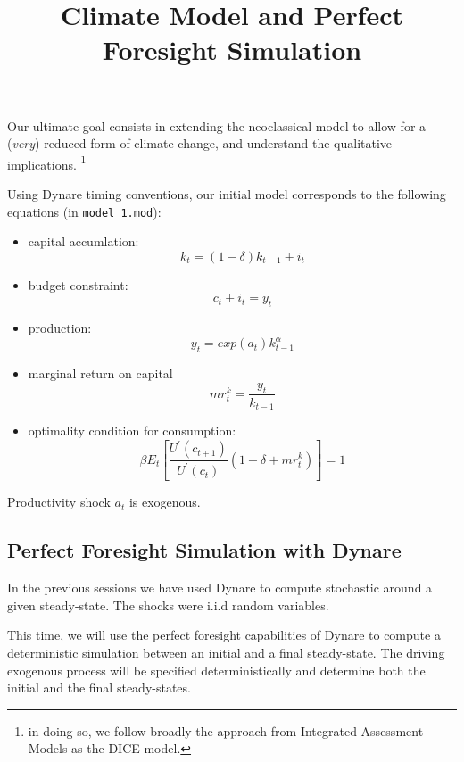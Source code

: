\documentclass[
  letterpaper,
  DIV=11,
  numbers=noendperiod]{scrartcl}
\title{Climate Model and Perfect Foresight Simulation}
\author{}
\date{}
\providecommand{\tightlist}{%
  \setlength{\itemsep}{0pt}\setlength{\parskip}{0pt}}\usepackage{longtable,booktabs,array}
\begin{document}
\maketitle
\ifdefined\Shaded\renewenvironment{Shaded}{\begin{tcolorbox}[breakable, borderline west={3pt}{0pt}{shadecolor}, enhanced, boxrule=0pt, interior hidden, sharp corners, frame hidden]}{\end{tcolorbox}}\fi

Our ultimate goal consists in extending the neoclassical model to allow
for a (\emph{very}) reduced form of climate change, and understand the
qualitative implications. \footnote{in doing so, we follow broadly the
  approach from Integrated Assessment Models as the DICE model.}

Using Dynare timing conventions, our initial model corresponds to the
following equations (in \texttt{model\_1.mod}):

\begin{itemize}
\tightlist
\item
  capital accumlation: \[k_t = (1-\delta) k_{t-1} + i_t\]
\item
  budget constraint: \[c_t + i_t = y_t\]
\item
  production: \[y_t = exp(a_t)k_{t-1}^{\alpha}\]
\item
  marginal return on capital \[{mr}^k_t = \frac{y_t}{k_{t-1}}\]
\item
  optimality condition for consumption:
  \[\beta E_t \left[ \frac{U^{\prime}(c_{t+1})}{U^{\prime}(c_t)} (1-\delta + {mr}^k_t  )\right] = 1\]
\end{itemize}

Productivity shock \(a_t\) is exogenous.

\hypertarget{perfect-foresight-simulation-with-dynare}{%
\subsection{Perfect Foresight Simulation with
Dynare}\label{perfect-foresight-simulation-with-dynare}}

In the previous sessions we have used Dynare to compute stochastic
around a given steady-state. The shocks were i.i.d random variables.

This time, we will use the perfect foresight capabilities of Dynare to
compute a deterministic simulation between an initial and a final
steady-state. The driving exogenous process will be specified
deterministically and determine both the initial and the final
steady-states.
\end{document}

